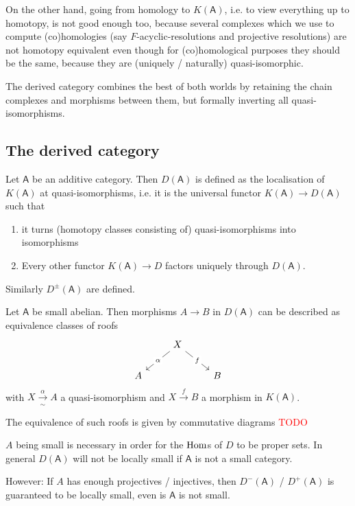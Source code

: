 \documentclass[fontsize=11pt,fleqn,a4paper]{scrartcl}
\begin{document}
\begin{remark}
On the other hand, going from homology to $K(\mathsf{A})$, i.e. to view everything up to homotopy, is not good enough too, because several complexes which we use to compute (co)homologies (say $F$-acyclic-resolutions and projective resolutions) are not homotopy equivalent even though for (co)homological purposes they should be the same, because they are (uniquely / naturally) quasi-isomorphic.

The derived category combines the best of both worlds by retaining the chain complexes and morphisms between them, but formally inverting all quasi-isomorphisms.
\end{remark}

\subsection{The derived category}

\begin{definition}
Let $\mathsf{A}$ be an additive category. Then $D(\mathsf{A})$ is defined as the localisation of $K(\mathsf{A})$ at quasi-isomorphisms, i.e. it is the universal functor $K(\mathsf{A}) \to D(\mathsf{A})$ such that
\begin{enumerate}
\item it turns (homotopy classes consisting of) quasi-isomorphisms into isomorphisms
\item Every other functor $K(\mathsf{A}) \to D$ factors uniquely through $D(\mathsf{A})$.
\end{enumerate}
Similarly $D^\pm(\mathsf{A})$ are defined.
\end{definition}

\begin{theorem}
Let $\mathsf{A}$ be small abelian. Then morphisms $A\to B$ in $D(\mathsf{A})$ can be described as equivalence classes of roofs
\[\begin{tikzcd}
&X \ar[rd,"f" description] \ar[ld,"\alpha" description]&\\
A && B
\end{tikzcd}\]
with $X\xrightarrow[\sim]{\alpha} A$ a quasi-isomorphism and $X\xrightarrow{f} B$ a morphism in $K(\mathsf{A})$.

The equivalence of such roofs is given by commutative diagrams
\textcolor{red}{TODO}
\end{theorem}

\begin{remark}
$A$ being small is necessary in order for the $\operatorname{Hom}$s of $D$ to be proper sets. In general $D(\mathsf{A})$ will not be locally small if $\mathsf{A}$ is not a small category.

However: If $A$ has enough projectives / injectives, then  $D^-(\mathsf{A})$ / $D^+(\mathsf{A})$ is guaranteed to be locally small, even is $\mathsf{A}$ is not small.
\end{remark}
\end{document}
